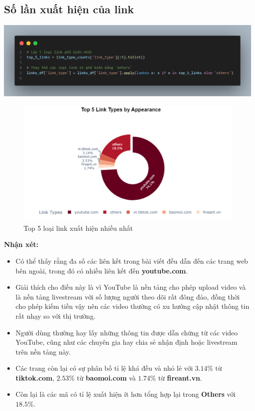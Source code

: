 \subsection{Số lần xuất hiện của link}
\begin{center}
\includegraphics[width=0.75\linewidth]{images/code-2.16.png}
\end{center}

\begin{figure}[H]
    \centering
    \includegraphics[width=0.9\linewidth]{images/plot-2.2-doughnut_chart.png}
    \caption{Top 5 loại link xuất hiện nhiều nhất}
    \label{fig:2.5}
\end{figure}

\textbf{Nhận xét:}
\begin{itemize}
    \item Có thể thấy rằng đa số các liên kết trong bài viết đều dẫn đến các trang web bên ngoài, trong đó có nhiều liên kết đến \textbf{youtube.com}. 
    \item Giải thích cho điều này là vì YouTube là nền tảng cho phép upload video và là nền tảng livestream với số lượng người theo dõi rất đông đảo, đồng thời cho phép kiếm tiền vậy nên các video thường có xu hướng cập nhật thông tin rất nhạy so với thị trường.
    \item Người dùng thường hay lấy những thông tin được dẫn chứng từ các video YouTube, cũng như các chuyên gia hay chia sẻ nhận định hoặc livestream trên nền tảng này.
    \item Các trang còn lại có sự phân bố tỉ lệ khá đều và nhỏ lẻ với $3.14\%$ từ \textbf{tiktok.com}, $2.53\%$ từ \textbf{baomoi.com} và $1.74\%$ từ \textbf{fireant.vn}.
    \item Còn lại là các mã có tỉ lệ xuất hiện ít hơn tổng hợp lại trong \textbf{Others} với $18.5\%$.
\end{itemize}
            

